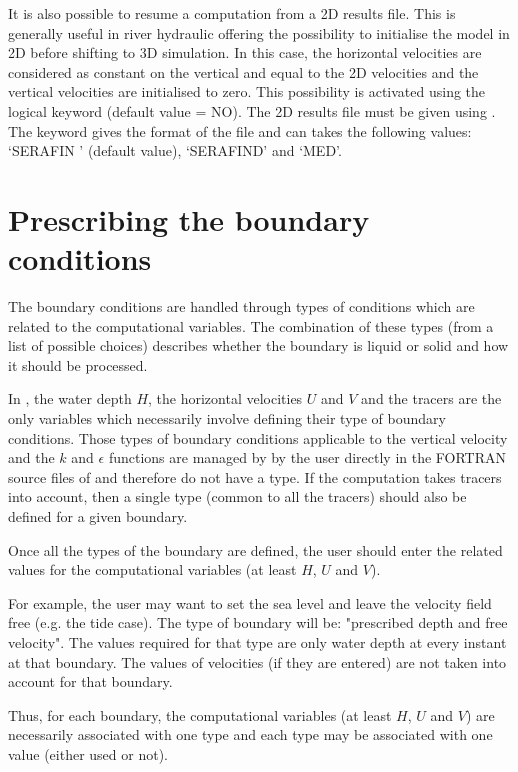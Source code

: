 It is also possible to resume a computation from a 2D results file. This is
generally useful in river hydraulic offering the possibility to initialise the
model in 2D before shifting to 3D simulation. In this case, the horizontal
velocities are considered as constant on the vertical and equal to the 2D
velocities and the vertical velocities are initialised to zero. This
possibility is activated using the  logical keyword
(default value = NO). The 2D results file must be given using . The keyword  gives
the format of the file and can takes the following values: `SERAFIN ' (default
value), `SERAFIND' and `MED'.


\section{Prescribing the boundary conditions}
\label{sec:prescr_BC}

The boundary conditions are handled through types of conditions which are
related to the computational variables. The combination of these types (from a
list of possible choices) describes whether the boundary is liquid or solid and
how it should be processed.

In , the water depth $H$, the horizontal velocities $U$
and $V$ and the tracers are the only variables which necessarily involve
defining their type of boundary conditions. Those types of boundary conditions
applicable to the vertical velocity and the $k$ and $\epsilon$ functions
are managed by  by the user directly in the FORTRAN source files of
 and therefore do not have a type. If the computation takes tracers
into account, then a single type (common to all the tracers) should also be
defined for a given boundary.

Once all the types of the boundary are defined, the user should enter the
related values for the computational variables (at least $H$, $U$ and $V$).

For example, the user may want to set the sea level and leave the velocity
field free (e.g. the tide case). The type of boundary will be: "prescribed
depth and free velocity". The values required for that type are only water
depth at every instant at that boundary. The values of velocities (if they are
entered) are not taken into account for that boundary.

Thus, for each  boundary, the computational variables (at least
$H$, $U$ and $V$) are necessarily associated with one type
and each type may be associated with one value (either used or not).

